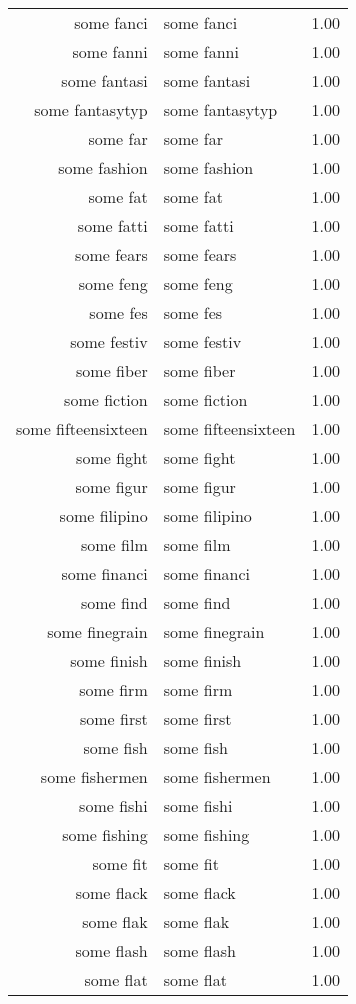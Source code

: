 \begin{table}[ht]
\begin{tabular}{rlr}
  some fanci & some fanci & 1.00 \\ 
  some fanni & some fanni & 1.00 \\ 
  some fantasi & some fantasi & 1.00 \\ 
  some fantasytyp & some fantasytyp & 1.00 \\ 
  some far & some far & 1.00 \\ 
  some fashion & some fashion & 1.00 \\ 
  some fat & some fat & 1.00 \\ 
  some fatti & some fatti & 1.00 \\ 
  some fears & some fears & 1.00 \\ 
  some feng & some feng & 1.00 \\ 
  some fes & some fes & 1.00 \\ 
  some festiv & some festiv & 1.00 \\ 
  some fiber & some fiber & 1.00 \\ 
  some fiction & some fiction & 1.00 \\ 
  some fifteensixteen & some fifteensixteen & 1.00 \\ 
  some fight & some fight & 1.00 \\ 
  some figur & some figur & 1.00 \\ 
  some filipino & some filipino & 1.00 \\ 
  some film & some film & 1.00 \\ 
  some financi & some financi & 1.00 \\ 
  some find & some find & 1.00 \\ 
  some finegrain & some finegrain & 1.00 \\ 
  some finish & some finish & 1.00 \\ 
  some firm & some firm & 1.00 \\ 
  some first & some first & 1.00 \\ 
  some fish & some fish & 1.00 \\ 
  some fishermen & some fishermen & 1.00 \\ 
  some fishi & some fishi & 1.00 \\ 
  some fishing & some fishing & 1.00 \\ 
  some fit & some fit & 1.00 \\ 
  some flack & some flack & 1.00 \\ 
  some flak & some flak & 1.00 \\ 
  some flash & some flash & 1.00 \\ 
  some flat & some flat & 1.00 \\ 

\end{tabular}
\end{table}
